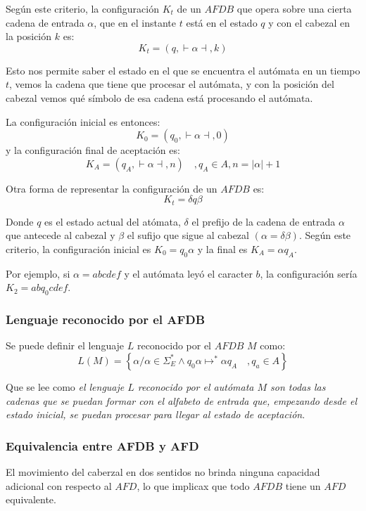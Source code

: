 \documentclass[12pt]{article}
\begin{document}
Según este criterio, la configuración $ K_{t} $ de un $ AFDB $ que opera sobre una cierta cadena de entrada $ \alpha $, que en el instante $ t $ está en el estado $ q $ y con el cabezal en la posición $ k $ es:
\[
K_{t} = (q,  \vdash \alpha  \dashv , k)
\]

Esto nos permite saber el estado en el que se encuentra el autómata en un tiempo $ t $, vemos la cadena que tiene que procesar el autómata, y con la posición del cabezal vemos qué símbolo de esa cadena está procesando el autómata.

La configuración inicial es entonces:
\[
K_{0} = (q_{0}, \vdash \alpha \dashv ,0)
\]
y la configuración final de aceptación es:
\[
K_{A} = (q_{A},  \vdash \alpha \dashv ,n) \quad ,q_{A} \in A,n=\left|\alpha\right|+1
\]

Otra forma de representar la configuración de un $ AFDB $ es:
\[
K_{t} = \delta q\beta
\]

Donde $ q $ es el estado actual del atómata, $ \delta $ el prefijo de la cadena de entrada $ \alpha $ que antecede al cabezal y $ \beta $ el sufijo que sigue al cabezal $ (\alpha=\delta\beta) $. Según este criterio, la configuración inicial es $ K_{0}=q_{0}\alpha $ y la final es $ K_{A}=\alpha q_{A} $.

Por ejemplo, si $ \alpha=abcdef $ y el autómata leyó el caracter $ b $, la configuración sería $ K_{2}=abq_{0}cdef $.

\subsubsection{Lenguaje reconocido por el AFDB}
Se puede definir el lenguaje $ L $ reconocido por el $ AFDB $ $ M $ como:
\[
L(M) = \left\{\alpha / \alpha \in \Sigma_{E}^{*} \land q_{0}\alpha \mapsto ^{*}\alpha q_{A}\quad ,q_{a} \in A\right\}
\]

Que se lee como \textit{el lenguaje $ L $ reconocido por el autómata $ M $ son todas las cadenas que se puedan formar con el alfabeto de entrada que, empezando desde el estado inicial, se puedan procesar para llegar al estado de aceptación}.

\subsubsection{Equivalencia entre AFDB y AFD}
El movimiento del caberzal en dos sentidos no brinda ninguna capacidad adicional con respecto al $ AFD $, lo que implicax que todo $ AFDB $ tiene un $ AFD $ equivalente.
\end{document}
